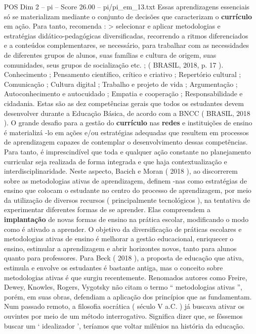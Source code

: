 \begin{textsample}{POS Dim 2 – pi – Score 26.00 – pi/pi\_em\_13.txt}
Essas aprendizagens essenciais só se materializam mediante o conjunto de decisões que caracterizam o \textbf{currículo} em ação.
Para tanto, recomenda : > selecionar e aplicar metodologias e estratégias didático-pedagógicas diversificadas, recorrendo a ritmos diferenciados e a conteúdos complementares, se necessário, para trabalhar com as necessidades de diferentes grupos de alunos, suas famílias e cultura de origem, suas comunidades, seus grupos de socialização etc. ; ( BRASIL, 2018, p. 17 ).
Conhecimento ; Pensamento científico, crítico e criativo ; Repertório cultural ; Comunicação ; Cultura digital ; Trabalho e projeto de vida ; Argumentação ; Autoconhecimento e autocuidado ; Empatia e cooperação ; Responsabilidade e cidadania.
Estas são as dez competências gerais que todos os estudantes devem desenvolver durante a Educação Básica, de acordo com a BNCC ( BRASIL, 2018 ).
O grande desafio para a gestão do \textbf{currículo} nas \textbf{redes} e instituições de ensino é materializá -lo em ações e/ou estratégias adequadas que resultem em processos de aprendizagem capazes de contemplar o desenvolvimento dessas competências.
Para tanto, é imprescindível que toda e qualquer ação constante no planejamento curricular seja realizada de forma integrada e que haja contextualização e interdisciplinaridade.
Neste aspecto, Bacich e Moran ( 2018 ), ao discorrerem sobre as metodologias ativas de aprendizagem, definem -nas como estratégias de ensino que colocam o estudante no centro do processo de aprendizagem, por meio da utilização de diversos recursos ( principalmente tecnológicos ), na tentativa de experimentar diferentes formas de se aprender.
Elas compreendem a \textbf{implantação} de novas formas de ensino na prática escolar, modificando o modo como é ativado a aprender.
O objetivo da diversificação de práticas escolares e metodologias ativas de ensino é melhorar a gestão educacional, enriquecer o ensino, estimular a aprendizagem e abrir horizontes novos, tanto para alunos quanto para professores.
Para Beck ( 2018 ), a proposta de educação que ativa, estimula e envolve os estudantes é bastante antiga, mas o conceito sobre metodologias ativas é que surgiu recentemente.
Renomados autores como Freire, Dewey, Knowles, Rogers, Vygotsky não citam o termo “ metodologias ativas ”, porém, em suas obras, defendiam a aplicação dos princípios que as fundamentam.
Num passado remoto, a filosofia socrática ( século V a.C. ) já buscava ativar os ouvintes por meio de um método interrogativo.
Significa dizer que, se fôssemos buscar um ‘ idealizador ’, teríamos que voltar milênios na história da educação.

\end{textsample}
